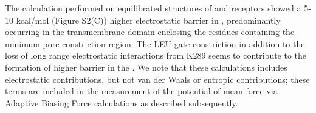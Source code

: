 \documentclass[9pt,twocolumn,twoside,lineno]{pnas-new}
\begin{document}
The calculation performed on equilibrated  structures of \WT and \MT receptors showed a 5-10 kcal/mol (Figure S2(C)) higher electrostatic barrier in \MT , predominantly occurring in the transmembrane domain enclosing the residues containing the minimum pore constriction region. The LEU-gate constriction in addition to the loss of long range electrostatic interactions from K289 seems to contribute to the formation of higher barrier in the \MT.
We note that these calculations includes electrostatic contributions, but not van der Waals or entropic contributions; these terms are included in the measurement of the potential of mean force via Adaptive Biasing Force calculations as described subsequently. 



\end{document}
